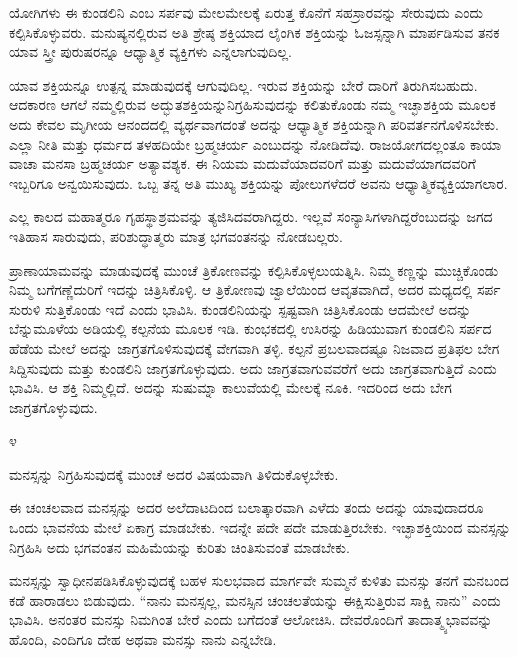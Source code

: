 \vskip 2pt

ಯೋಗಿಗಳು ಈ ಕುಂಡಲಿನಿ ಎಂಬ ಸರ್ಪವು ಮೇಲಮೇಲಕ್ಕೆ ಏರುತ್ತ ಕೊನೆಗೆ ಸಹಸ್ರಾರವನ್ನು ಸೇರುವುದು ಎಂದು ಕಲ್ಪಿಸಿಕೊಳ್ಳುವರು. ಮನುಷ್ಯನಲ್ಲಿರುವ ಅತಿ ಶ್ರೇಷ್ಠ ಶಕ್ತಿಯಾದ ಲೈಂಗಿಕ ಶಕ್ತಿಯನ್ನು ಓಜಸ್ಸನ್ನಾಗಿ ಮಾರ್ಪಡಿಸುವ ತನಕ ಯಾವ ಸ್ತ್ರೀ ಪುರುಷರನ್ನೂ ಆಧ್ಯಾತ್ಮಿಕ ವ್ಯಕ್ತಿಗಳು ಎನ್ನಲಾಗುವುದಿಲ್ಲ.

\vskip 2pt

ಯಾವ ಶಕ್ತಿಯನ್ನೂ ಉತ್ಪನ್ನ ಮಾಡುವುದಕ್ಕೆ ಆಗುವುದಿಲ್ಲ. ಇರುವ ಶಕ್ತಿಯನ್ನು ಬೇರೆ ದಾರಿಗೆ ತಿರುಗಿಸಬಹುದು. ಆದಕಾರಣ ಆಗಲೆ ನಮ್ಮಲ್ಲಿರುವ ಅದ್ಭುತಶಕ್ತಿಯನ್ನು\break ನಿಗ್ರಹಿಸುವುದನ್ನು ಕಲಿತುಕೊಂಡು ನಮ್ಮ ಇಚ್ಛಾಶಕ್ತಿಯ ಮೂಲಕ ಅದು ಕೇವಲ ಮೃಗೀಯ ಆನಂದದಲ್ಲಿ ವ್ಯರ್ಥವಾಗದಂತೆ ಅದನ್ನು ಆಧ್ಯಾತ್ಮಿಕ ಶಕ್ತಿಯನ್ನಾಗಿ ಪರಿವರ್ತನಗೊಳಿಸಬೇಕು. ಎಲ್ಲಾ ನೀತಿ ಮತ್ತು ಧರ್ಮದ ತಳಹದಿಯೇ ಬ್ರಹ್ಮಚರ್ಯ ಎಂಬುದನ್ನು ನೋಡಿದೆವು. ರಾಜಯೋಗದಲ್ಲಂತೂ ಕಾಯಾ ವಾಚಾ ಮನಸಾ ಬ್ರಹ್ಮಚರ್ಯ ಅತ್ಯಾವಶ್ಯಕ. ಈ ನಿಯಮ ಮದುವೆಯಾದವರಿಗೆ ಮತ್ತು ಮದುವೆಯಾಗದವರಿಗೆ ಇಬ್ಬರಿಗೂ ಅನ್ವಯಿಸುವುದು. ಒಬ್ಬ ತನ್ನ ಅತಿ ಮುಖ್ಯ ಶಕ್ತಿಯನ್ನು ಪೋಲುಗಳೆದರೆ ಅವನು ಆಧ್ಯಾತ್ಮಿಕ\break ವ್ಯಕ್ತಿಯಾಗಲಾರ.

\vskip 2pt

ಎಲ್ಲ ಕಾಲದ ಮಹಾತ್ಮರೂ ಗೃಹಸ್ಥಾಶ್ರಮವನ್ನು ತ್ಯಜಿಸಿದವರಾಗಿದ್ದರು. ಇಲ್ಲವೆ ಸಂನ್ಯಾಸಿಗಳಾಗಿದ್ದರೆಂಬುದನ್ನು ಜಗದ ಇತಿಹಾಸ ಸಾರುವುದು, ಪರಿಶುದ್ಧಾತ್ಮರು ಮಾತ್ರ ಭಗವಂತನನ್ನು ನೋಡಬಲ್ಲರು.

\vskip 2pt

ಪ್ರಾಣಾಯಾಮವನ್ನು ಮಾಡುವುದಕ್ಕೆ ಮುಂಚೆ ತ್ರಿಕೋಣವನ್ನು ಕಲ್ಪಿಸಿಕೊಳ್ಳಲು\break ಯತ್ನಿಸಿ. ನಿಮ್ಮ ಕಣ್ಣನ್ನು ಮುಚ್ಚಿಕೊಂಡು ನಿಮ್ಮ ಬಗೆಗಣ್ಣೆದುರಿಗೆ ಇದನ್ನು ಚಿತ್ರಿಸಿಕೊಳ್ಳಿ. ಆ ತ್ರಿಕೋಣವು ಜ್ವಾಲೆಯಿಂದ ಆವೃತವಾಗಿದೆ, ಅದರ ಮಧ್ಯದಲ್ಲಿ ಸರ್ಪ ಸುರುಳಿ ಸುತ್ತಿಕೊಂಡು ಇದೆ ಎಂದು ಭಾವಿಸಿ. ಕುಂಡಲಿನಿಯನ್ನು ಸ್ಪಷ್ಟವಾಗಿ ಚಿತ್ರಿಸಿಕೊಂಡು ಆದಮೇಲೆ ಅದನ್ನು ಬೆನ್ನುಮೂಳೆಯ ಅಡಿಯಲ್ಲಿ ಕಲ್ಪನೆಯ ಮೂಲಕ ಇಡಿ. ಕುಂಭಕದಲ್ಲಿ ಉಸಿರನ್ನು ಹಿಡಿಯುವಾಗ ಕುಂಡಲಿನಿ ಸರ್ಪದ ಹೆಡೆಯ ಮೇಲೆ ಅದನ್ನು ಜಾಗ್ರತಗೊಳಿಸುವುದಕ್ಕೆ ವೇಗವಾಗಿ ತಳ್ಳಿ. ಕಲ್ಪನೆ ಪ್ರಬಲವಾದಷ್ಟೂ ನಿಜವಾದ ಪ್ರತಿಫಲ ಬೇಗ ಸಿದ್ದಿಸುವುದು ಮತ್ತು ಕುಂಡಲಿನಿ ಜಾಗ್ರತಗೊಳ್ಳುವುದು. ಅದು ಜಾಗ್ರತವಾಗುವವರೆಗೆ ಅದು ಜಾಗ್ರತವಾಗುತ್ತಿದೆ ಎಂದು ಭಾವಿಸಿ. ಆ ಶಕ್ತಿ ನಿಮ್ಮಲ್ಲಿದೆ. ಅದನ್ನು ಸುಷುಮ್ನಾ ಕಾಲುವೆಯಲ್ಲಿ ಮೇಲಕ್ಕೆ ನೂಕಿ. ಇದರಿಂದ ಅದು ಬೇಗ ಜಾಗ್ರತಗೊಳ್ಳುವುದು.

\begin{center}
೪
\end{center}

ಮನಸ್ಸನ್ನು ನಿಗ್ರಹಿಸುವುದಕ್ಕೆ ಮುಂಚೆ ಅದರ ವಿಷಯವಾಗಿ ತಿಳಿದುಕೊಳ್ಳಬೇಕು.

\vskip 3pt

ಈ ಚಂಚಲವಾದ ಮನಸ್ಸನ್ನು ಅದರ ಅಲೆದಾಟದಿಂದ ಬಲಾತ್ಕಾರವಾಗಿ ಎಳೆದು ತಂದು ಅದನ್ನು ಯಾವುದಾದರೂ ಒಂದು ಭಾವನೆಯ ಮೇಲೆ ಏಕಾಗ್ರ ಮಾಡಬೇಕು. ಇದನ್ನೇ ಪದೇ ಪದೇ ಮಾಡುತ್ತಿರಬೇಕು. ಇಚ್ಛಾಶಕ್ತಿಯಿಂದ ಮನಸ್ಸನ್ನು ನಿಗ್ರಹಿಸಿ ಅದು ಭಗವಂತನ ಮಹಿಮೆಯನ್ನು ಕುರಿತು ಚಿಂತಿಸುವಂತೆ ಮಾಡಬೇಕು.

\vskip 3pt

ಮನಸ್ಸನ್ನು ಸ್ವಾಧೀನಪಡಿಸಿಕೊಳ್ಳುವುದಕ್ಕೆ ಬಹಳ ಸುಲಭವಾದ ಮಾರ್ಗವೇ ಸುಮ್ಮನೆ ಕುಳಿತು ಮನಸ್ಸು ತನಗೆ ಮನಬಂದ ಕಡೆ ಹಾರಾಡಲು ಬಿಡುವುದು. “ನಾನು ಮನಸ್ಸಲ್ಲ, ಮನಸ್ಸಿನ ಚಂಚಲತೆಯನ್ನು ಈಕ್ಷಿಸುತ್ತಿರುವ ಸಾಕ್ಷಿ ನಾನು'' ಎಂದು ಭಾವಿಸಿ. ಅನಂತರ ಮನಸ್ಸು ನಿಮಗಿಂತ ಬೇರೆ ಎಂದು ಬಗೆದಂತೆ ಆಲೋಚಿಸಿ. ದೇವರೊಂದಿಗೆ ತಾದಾತ್ಮ್ಯಭಾವವನ್ನು ಹೊಂದಿ, ಎಂದಿಗೂ ದೇಹ ಅಥವಾ ಮನಸ್ಸು ನಾನು ಎನ್ನಬೇಡಿ.


